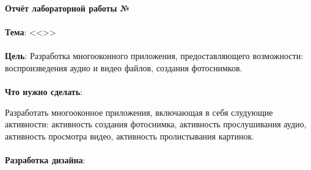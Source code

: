 \documentclass[12pt, a4paper, simple]{eskdtext}
\def \gpiDocTopic {Отчёт лабораторной работы №\gpiDocNum}
\begin{document}
    
    \begin{center}
        \textbf{\gpiDocTopic}
    \end{center}

    \paragraph{} \textbf{Тема}: <<\gpiTopicRep>>

    \paragraph{} \textbf{Цель}: Разработка многооконного приложения,
    предоставляющего возможности: воспроизведения аудио и видео файлов,
    создания фотоснимков.

    \paragraph{} \textbf{Что нужно сделать}:

    Разработать многооконное приложения, включающая в себя слудующие активности:
    активность создания фотоснимка,
    активность прослушивания аудио,
    активность просмотра видео,
    активность пролистывания картинок.

    \paragraph{} \textbf{Разработка дизайна}:
\end{document}
